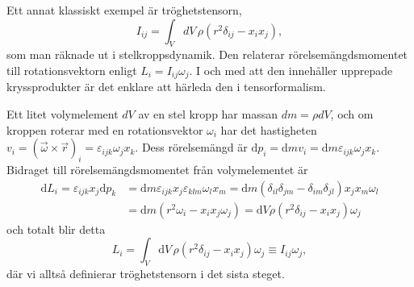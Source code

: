 \documentclass[%
oneside,                 %
final,                   %
10pt]{article}
\newenvironment{notice_mdfboxadmon}[1][]{
\begin{notice_mdfboxmdframed}[frametitle=#1]
}
{
\end{notice_mdfboxmdframed}
}
\begin{document}
\begin{notice_mdfboxadmon}[Tröghetstensorn]
Ett annat klassiskt exempel är tröghetstensorn,  
\begin{equation}
I_{ij}=\int_VdV\,\rho(r^2\delta_{ij}-x_ix_j),
\end{equation}
som man räknade ut i stelkroppsdynamik. Den relaterar rörelsemängdsmomentet till
rotationsvektorn enligt $L_i=I_{ij}\omega_j$. I och med att den innehåller upprepade
kryssprodukter är det enklare att härleda den i tensorformalism. 

Ett litet volymelement $dV$ av en stel kropp har massan $dm=\rho dV$,
och om kroppen roterar med en rotationsvektor $\omega_i$ har
det hastigheten $v_i=(\vec\omega\times\vec{r})_i=\varepsilon_{ijk}\omega_jx_k$. 
Dess rörelsemängd är $\mbox{d}p_i=\mbox{d}mv_i=\mbox{d}m\varepsilon_{ijk}\omega_jx_k$. Bidraget till rörelsemängdsmomentet från volymelementet är 
\begin{align}
\mbox{d}L_i = \varepsilon_{ijk}x_j \mbox{d}p_k &= \mbox{d}m\varepsilon_{ijk}x_j\varepsilon_{klm}\omega_lx_m
=\mbox{d}m(\delta_{il}\delta_{jm}-\delta_{im}\delta_{jl})x_jx_m\omega_l \nonumber \\
&=\mbox{d}m(r^2\omega_i-x_ix_j\omega_j)=\mbox{d}V\rho(r^2\delta_{ij}-x_ix_j)\omega_j
\end{align}
och totalt blir detta
\begin{equation}
L_i = \int_V \mbox{d}V\,\rho(r^2\delta_{ij}-x_ix_j) \omega_j \equiv I_{ij} \omega_j,
\end{equation}
där vi alltså definierar tröghetstensorn i det sista steget.
\end{notice_mdfboxadmon} %





\end{document}

